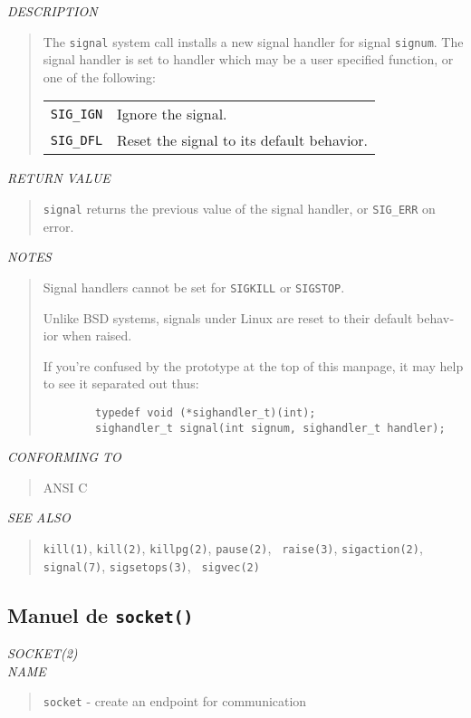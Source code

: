 \begin{appendix}
\begin{english}
{\sl DESCRIPTION}
\begin{quote}
	The {\tt signal} system call installs a new signal handler for signal
	{\tt signum}. The signal handler is set to handler which may be a user
	specified function, or one of the following:

	\begin{tabular}{lp{8cm}}
		{\tt SIG\_IGN} & Ignore the signal.\\
		{\tt SIG\_DFL} & Reset the signal to its default behavior.
	\end{tabular}
\end{quote}

{\sl RETURN VALUE}
\begin{quote}
	{\tt signal} returns the previous value of the signal handler, or
	{\tt SIG\_ERR} on error.
\end{quote}

{\sl NOTES}
\begin{quote}
	Signal handlers cannot be set for {\tt SIGKILL} or {\tt SIGSTOP}.

	Unlike BSD systems, signals under Linux are reset to their default
	behavior when raised.

	If you're confused by the prototype at the top of this manpage,
	it may help to see it separated out thus:
	\begin{verbatim}
		typedef void (*sighandler_t)(int);
		sighandler_t signal(int signum, sighandler_t handler);
	\end{verbatim}
\end{quote}

{\sl CONFORMING TO}
\begin{quote}
	ANSI C
\end{quote}

{\sl SEE ALSO}
\begin{quote}
	{\tt kill(1)}, {\tt kill(2)}, {\tt killpg(2)}, {\tt pause(2)}, {\tt
raise(3)},
	{\tt sigaction(2)}, {\tt signal(7)}, {\tt sigsetops(3)}, {\tt
sigvec(2)}
\end{quote}
\end{english}

\subsection{Manuel de {\tt socket()}}
\begin{english}
{\sl SOCKET(2)}\\

{\sl NAME}
\begin{quote}
	{\tt socket} - create an endpoint for communication
\end{quote}


\end{english}
\end{appendix}
